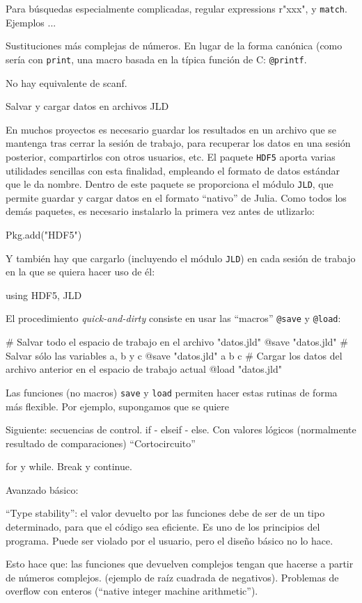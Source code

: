 ﻿\documentclass[spanish]{article}
\begin{document}
Para búsquedas especialmente complicadas, regular expressions
r"xxx", y \texttt{match}. Ejemplos ...

Sustituciones más complejas de números. En lugar de la forma canónica
(como sería con \texttt{print}, una macro basada en la típica función de C:
\texttt{@printf}.

No hay equivalente de scanf.


Salvar y cargar datos en archivos JLD

En muchos proyectos es necesario guardar los resultados en un archivo que
se mantenga tras cerrar la sesión de trabajo, para recuperar los datos en
una sesión posterior, compartirlos con otros usuarios, etc. El paquete
\texttt{HDF5} aporta varias utilidades sencillas con esta finalidad, empleando
el formato de datos estándar que le da nombre. Dentro de este paquete se
proporciona el módulo \texttt{JLD}, que permite guardar y cargar datos
en el formato ``nativo'' de Julia. Como todos los demás paquetes,
es necesario instalarlo la primera vez antes de utlizarlo:

Pkg.add("HDF5")

Y también hay que cargarlo (incluyendo el módulo \texttt{JLD}) en cada
sesión de trabajo en la que se quiera hacer uso de él:

using HDF5, JLD

El procedimiento \emph{quick-and-dirty} consiste en usar las ``macros''
\texttt{@save} y \texttt{@load}:

# Salvar todo el espacio de trabajo en el archivo "datos.jld"
@save "datos.jld"
# Salvar sólo las variables a, b y c
@save "datos.jld" a b c
# Cargar los datos del archivo anterior en el espacio de trabajo actual
@load "datos.jld"

Las funciones (no macros) \texttt{save} y \texttt{load} permiten hacer
estas rutinas de forma más flexible. Por ejemplo, supongamos que se quiere 


Siguiente: secuencias de control.
if - elseif - else. Con valores lógicos (normalmente resultado de comparaciones)
``Cortocircuito''

for y while. Break y continue.


Avanzado básico:

``Type stability'': el valor devuelto por las funciones debe de ser de un
tipo determinado, para que el código sea eficiente. Es uno de los principios
del programa. Puede ser violado por el usuario, pero el diseño básico no lo hace.

Esto hace que: las funciones que devuelven complejos tengan que hacerse a partir
de números complejos. (ejemplo de raíz cuadrada de negativos).
Problemas de overflow con enteros (``native integer machine arithmetic'').

 
\end{document}
